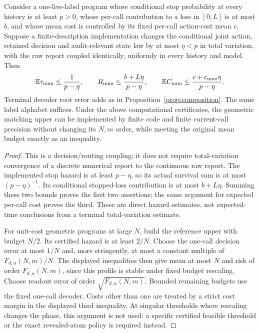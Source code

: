 \begin{proposition}\label{prop:finite}
Consider a one-live-label program whose conditional stop probability at every history is at least $p>0$, whose per-call contribution to a loss in $[0,L]$ is at most $b$, and whose mean cost is controlled by its fixed per-call action-cost mean $c$. Suppose a finite-description implementation changes the conditional joint action, retained decision and audit-relevant state law by at most $\eta<p$ in total variation, with the raw report coupled identically, uniformly in every history and model. Then
\[
 \mathbb E\tau_{\rm num}\le\frac1{p-\eta},\qquad
 R_{\rm num}\le\frac{b+L\eta}{p-\eta},\qquad
 \mathbb E C_{\rm num}\le\frac{c+c_{\max}\eta}{p-\eta}.
\]
Terminal decoder root error adds as in Proposition~\ref{prop:composition}. The same label alphabet suffices. Under the above computational certificates, the geometric matching upper can be implemented by finite code and finite current-call precision without changing its $N,m$ order, while meeting the original mean budget exactly as an inequality.
\end{proposition}
\begin{proof}
This is a decision/routing coupling; it does not require total-variation convergence of a discrete numerical report to the continuous raw report. The implemented stop hazard is at least $p-\eta$, so its actual survival sum is at most $(p-\eta)^{-1}$. Its conditional stopped-loss contribution is at most $b+L\eta$. Summing these two bounds proves the first two assertions; the same argument for expected per-call cost proves the third. These are direct hazard estimates, not expected-time conclusions from a terminal total-variation estimate.

For unit-cost geometric programs at large $N$, build the reference upper with budget $N/2$. Its certified hazard is at least $2/N$. Choose the one-call decision error at most $1/N$ and, more stringently, at most a constant multiple of $F_{d,\alpha}(N,m)/N$. The displayed inequalities then give mean at most $N$ and risk of order $F_{d,\alpha}(N,m)$, since this profile is stable under fixed budget rescaling. Choose readout error of order $\sqrt{F_{d,\alpha}(N,m)}$. Bounded remaining budgets use the fixed one-call decoder. Costs other than one are treated by a strict cost margin in the displayed third inequality. At singular thresholds where rescaling changes the phase, this argument is not used: a specific certified feasible threshold or the exact revealed-atom policy is required instead.
\end{proof}

